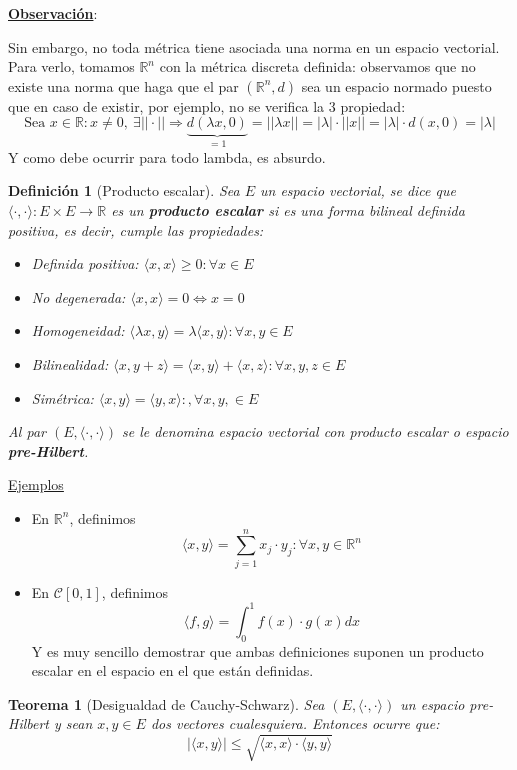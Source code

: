 \documentclass[10pt,a4paper,openright]{book}
\theoremstyle{break}
\newtheorem*{defi}{Definición}
\newtheorem*{theo}{Teorema}
\begin{document}
\underline{\textbf{Observación}}:

Sin embargo, no toda métrica tiene asociada una norma en un espacio vectorial. Para verlo, tomamos $\mathbb R^n$ con la métrica discreta definida: observamos que no existe una norma que haga que el par $(\mathbb R^n, d)$ sea un espacio normado puesto que en caso de existir, por ejemplo, no se verifica la 3 propiedad:
$$\mbox{Sea }x\in \mathbb R: x\neq 0, \ \exists ||\cdot||\Rightarrow\underbrace{d(\lambda x , 0)}_{=1} = ||\lambda x|| = |\lambda|\cdot ||x|| = |\lambda| \cdot d(x,0) = |\lambda|$$
Y como debe ocurrir para todo lambda, es absurdo.

\begin{defi}[Producto escalar]
Sea $E$ un espacio vectorial, se dice que $\langle \cdot, \cdot\rangle: E\times E \rightarrow \mathbb R$ es un \textbf{producto escalar} si es una forma bilineal definida positiva, es decir, cumple las propiedades:
\begin{itemize}
\item Definida positiva: $\langle x,x \rangle \geq 0 : \forall x \in E$
\item No degenerada: $\langle x,x \rangle = 0 \Leftrightarrow x = 0$
\item Homogeneidad: $\langle \lambda x, y \rangle = \lambda \langle x,y\rangle : \forall x, y \in E$
\item Bilinealidad: $\langle x,y+z\rangle = \langle x,y\rangle + \langle x,z\rangle : \forall x, y ,z \in E$
\item Simétrica: $\langle x,y\rangle = \langle y,x\rangle: ,\forall x, y ,\in E$
\end{itemize}
Al par $(E, \langle \cdot, \cdot\rangle)$ se le denomina espacio vectorial con producto escalar o espacio \textbf{pre-Hilbert}.
\end{defi}

\newpage

\underline{Ejemplos}
\begin{itemize}
\item En $\mathbb{R}^n$, definimos $$\langle x,y\rangle = \sum_{j=1}^{n} x_j \cdot y_j : \forall x,y \in \mathbb{R}^n$$

\item En $\mathcal{C}[0,1]$, definimos $$\langle f,g \rangle = \int_{0}^{1} f(x) \cdot g(x) dx$$
Y es muy sencillo demostrar que ambas definiciones suponen un producto escalar en el espacio en el que están definidas.
\end{itemize}

\begin{theo}[Desigualdad de Cauchy-Schwarz]
Sea $(E, \langle\cdot, \cdot\rangle)$ un espacio pre-Hilbert y sean $x,y \in E$ dos vectores cualesquiera. Entonces ocurre que:
$$|\langle x,y\rangle| \leq \sqrt{\langle x,x \rangle \cdot \langle y,y\rangle}$$
\end{theo}
\end{document}
